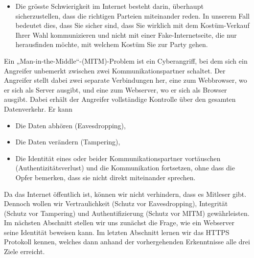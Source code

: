         \begin{itemize} 
            \item [{\emoji{warning}}] Die grösste Schwierigkeit im Internet besteht darin, überhaupt sicherzustellen, dass die richtigen Parteien miteinander reden. In unserem Fall bedeutet dies, dass Sie sicher sind, dass Sie wirklich mit dem Kostüm-Verkauf Ihrer Wahl kommunizieren und nicht mit einer Fake-Internetseite, die nur herausfinden möchte, mit welchem Kostüm Sie zur Party gehen. 
        \end{itemize}

        \begin{mydefinition} 
            Ein „Man-in-the-Middle“-(MITM)-Problem ist ein Cyberangriff, bei dem sich ein Angreifer unbemerkt zwischen zwei Kommunikationspartner schaltet. Der Angreifer stellt dabei zwei separate Verbindungen her, eine zum Webbrowser, wo er sich als Server ausgibt, und eine zum Webserver, wo er sich als Browser ausgibt. Dabei erhält der Angreifer vollständige Kontrolle über den gesamten Datenverkehr. Er kann 
            \begin{itemize} 
                \item Die Daten abhören (Eavesdropping), 
                \item Die Daten verändern (Tampering), 
                \item Die Identität eines oder beider Kommunikationspartner vortäuschen (Authentizitätsverlust) und die Kommunikation fortsetzen, ohne dass die Opfer bemerken, dass sie nicht direkt miteinander sprechen. 
            \end{itemize}
        \end{mydefinition}

        Da das Internet öffentlich ist, können wir nicht verhindern, dass es Mitleser gibt. Dennoch wollen wir Vertraulichkeit (Schutz vor Eavesdropping), Integrität (Schutz vor Tampering) und Authentifizierung (Schutz vor MITM) gewährleisten. Im nächsten Abschnitt stellen wir uns zunächst die Frage, wie ein Webserver seine Identität beweisen kann. Im letzten Abschnitt lernen wir das HTTPS Protokoll kennen, welches dann anhand der vorhergehenden Erkenntnisse alle drei Ziele erreicht.

